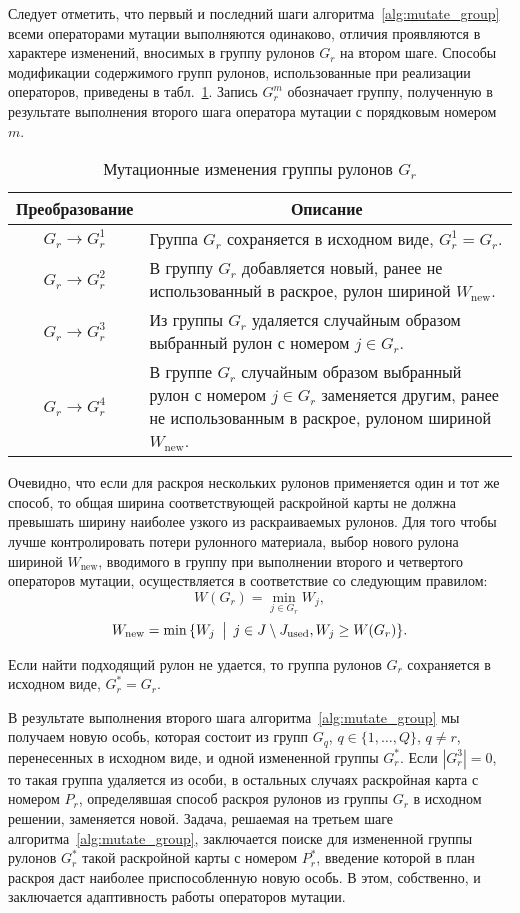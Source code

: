 \documentclass[12pt]{article}
\newcommand\tablecaption[1]{
    \captionsetup{labelsep=newline,justification=centering}
    \caption{#1}
}
\begin{document}
Следует отметить, что первый и последний шаги алгоритма~\ref{alg:mutate_group} 
всеми операторами мутации выполняются одинаково, отличия проявляются в характере 
изменений, вносимых в группу рулонов $G_r$ на втором шаге. Способы модификации 
содержимого групп рулонов, использованные при реализации операторов, приведены 
в табл.~\ref{tab:mutation}.
Запись $G_r^m$ обозначает группу, полученную в результате выполнения второго 
шага оператора мутации с порядковым номером $m$.
\begin{table}[ht]
    \centering
    \tablecaption{Мутационные изменения группы рулонов $G_r$}
    \label{tab:mutation}    
    \begin{tabular}{|c|p{}|}
        \hline Преобразование & \multicolumn{1}{c|}{Описание} \\ \hline
        $G_r \rightarrow G_r^1$ & 
            Группа $G_r$ сохраняется в исходном виде, $G_r^1=G_r$. \\ \hline
        $G_r \rightarrow G_r^2$ & 
            В группу $G_r$ добавляется новый, ранее не использованный в 
            раскрое, рулон шириной $W_{\text{new}}$. \\ \hline
        $G_r \rightarrow G_r^3$ & 
            Из группы $G_r$ удаляется случайным образом выбранный рулон с 
            номером $j \in G_r$. \\ \hline
        $G_r \rightarrow G_r^4$ &
             В группе $G_r$ случайным образом выбранный рулон с номером 
             $j \in G_r$ заменяется другим, ранее не использованным в раскрое, 
             рулоном шириной $W_{\text{new}}$. \\ \hline
    \end{tabular}    
\end{table}

Очевидно, что если для раскроя нескольких рулонов применяется один и тот же 
способ, то общая ширина соответствующей раскройной карты не должна превышать 
ширину наиболее узкого из раскраиваемых рулонов. Для того чтобы лучше 
контролировать потери рулонного материала, выбор нового рулона шириной 
$W_{\text{new}}$, вводимого в группу при выполнении второго и четвертого 
операторов мутации, осуществляется в соответствие со следующим правилом:
\[W(G_r)=\min_{j \in G_r}{W_j},\]
\[W_{\text{new}}=\min{\{ W_j \: \bigm| \: j \in J \setminus J_{\text{used}}, W_j \geq W(G_r) \}}.\]

Если найти подходящий рулон не удается, то группа рулонов $G_r$ сохраняется 
в исходном виде, $G_r^*=G_r$.

В результате выполнения второго шага алгоритма~\ref{alg:mutate_group} 
мы получаем новую 
особь, которая состоит из групп $G_q$, $q \in \{1,\ldots,Q\}$, $q \neq r$, 
перенесенных в исходном виде, и одной измененной группы $G_r^*$. Если 
$|G_r^3|=0$, то такая группа удаляется из особи, в остальных случаях 
раскройная карта с номером $P_r$, определявшая способ раскроя рулонов из 
группы $G_r$ в исходном решении, заменяется новой. Задача, решаемая на третьем 
шаге алгоритма~\ref{alg:mutate_group}, заключается поиске для измененной 
группы рулонов $G_r^*$ такой 
раскройной карты с номером $P_r^*$, введение которой в план раскроя даст 
наиболее приспособленную новую особь. В этом, собственно, и заключается 
адаптивность работы операторов мутации.
\end{document}
